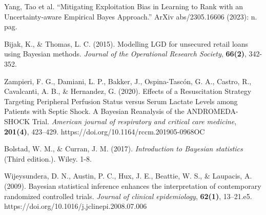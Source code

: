 \documentclass[landscape,a0paper,fontscale=0.285]{baposter} %
\begin{document}
\begin{poster}
{\begin{thebibliography}{00}
Yang, Tao et al. “Mitigating Exploitation Bias in Learning to Rank with an Uncertainty-aware Empirical Bayes Approach.” ArXiv abs/2305.16606 (2023): n. pag.

Bijak, K., \& Thomas, L. C. (2015). Modelling LGD for unsecured retail loans using Bayesian methods. \emph{Journal of the Operational Research Society}, \textbf{66(2)}, 342-352.

 Zampieri, F. G., Damiani, L. P., Bakker, J., Ospina-Tascón, G. A., Castro, R., Cavalcanti, A. B., \& Hernandez, G. (2020). Effects of a Resuscitation Strategy Targeting Peripheral Perfusion Status versus Serum Lactate Levels among Patients with Septic Shock. A Bayesian Reanalysis of the ANDROMEDA-SHOCK Trial. \emph{American journal of respiratory and critical care medicine}, \textbf{201(4)}, 423–429. https://doi.org/10.1164/rccm.201905-0968OC

Bolstad, W. M., \& Curran, J. M. (2017). \emph{Introduction to Bayesian statistics} (Third edition.). Wiley. 1-8.

Wijeysundera, D. N., Austin, P. C., Hux, J. E., Beattie, W. S., \& Laupacis, A. (2009). Bayesian statistical inference enhances the interpretation of contemporary randomized controlled trials. \emph{Journal of clinical epidemiology}, \textbf{62(1)}, 13–21.e5. https://doi.org/10.1016/j.jclinepi.2008.07.006

\end{thebibliography}

}




\end{poster}
\end{document}
